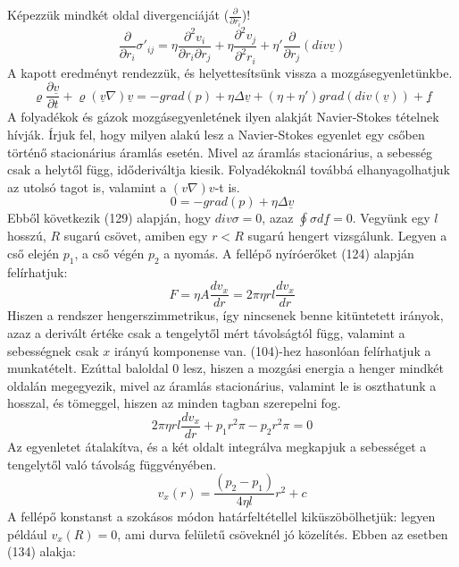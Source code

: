 \documentclass[a4paper,12pt]{article}
\begin{document}
Képezzük mindkét oldal divergenciáját ($\frac{\partial}{\partial r_i}$)!
\begin{equation}
\frac{\partial}{\partial r_i}\sigma'_{ij}=\eta\frac{\partial^2v_i}{\partial r_i\partial r_j}+\eta\frac{\partial^2 v_j}{\partial^2 r_i}+\eta'\frac{\partial}{\partial r_j}(div\underline{v})
\end{equation}
A kapott eredményt rendezzük, és helyettesítsünk vissza a mozgásegyenletünkbe.
\begin{equation}
\varrho\frac{\partial\underline{v}}{\partial t}+\varrho(\underline{v}\nabla)\underline{v}=-grad(p)+\eta\Delta\underline{v}+(\eta+\eta')grad(div(\underline{v}))+\underline{f}
\end{equation}
A folyadékok és gázok mozgásegyenletének ilyen alakját Navier-Stokes tételnek hívják.
Írjuk fel, hogy milyen alakú lesz a Navier-Stokes egyenlet egy csőben történő stacionárius áramlás esetén. Mivel az áramlás stacionárius, a sebesség csak a helytől függ, időderiváltja kiesik. Folyadékoknál továbbá elhanyagolhatjuk az utolsó tagot is, valamint a $(v\nabla)v$-t is.
\begin{equation}
0=-grad(p)+\eta\Delta\underline{v}
\end{equation}
Ebből következik (129) alapján, hogy $div\sigma=0$, azaz $\oint\sigma d\underline{f}=0$. Vegyünk egy $l$ hosszú, $R$ sugarú csövet, amiben egy $r<R$ sugarú hengert vizsgálunk. Legyen a cső elején $p_1$, a cső végén $p_2$ a nyomás. A fellépő nyíróerőket (124) alapján felírhatjuk:
\begin{equation}
F=\eta A\frac{dv_x}{dr}=2\pi\eta rl\frac{dv_x}{dr}
\end{equation}
Hiszen a rendszer hengerszimmetrikus, így nincsenek benne kitüntetett irányok, azaz a derivált értéke csak a tengelytől mért távolságtól függ, valamint a sebességnek csak $x$ irányú komponense van.
(104)-hez hasonlóan felírhatjuk a munkatételt. Ezúttal baloldal 0 lesz, hiszen a mozgási energia a henger mindkét oldalán megegyezik, mivel az áramlás stacionárius, valamint le is oszthatunk a hosszal, és tömeggel, hiszen az minden tagban szerepelni fog.
\begin{equation}
2\pi\eta rl\frac{d v_x}{dr}+p_1r^2\pi-p_2r^2\pi=0
\end{equation}
Az egyenletet átalakítva, és a két oldalt integrálva megkapjuk a sebességet a tengelytől való távolság függvényében.
\begin{equation}
v_x(r)=\frac{(p_2-p_1)}{4\eta l}r^2+c
\end{equation}
A fellépő konstanst a szokásos módon határfeltétellel kiküszöbölhetjük: legyen például $v_x(R)=0$, ami durva felületű csöveknél jó közelítés. Ebben az esetben (134) alakja:
\end{document}

